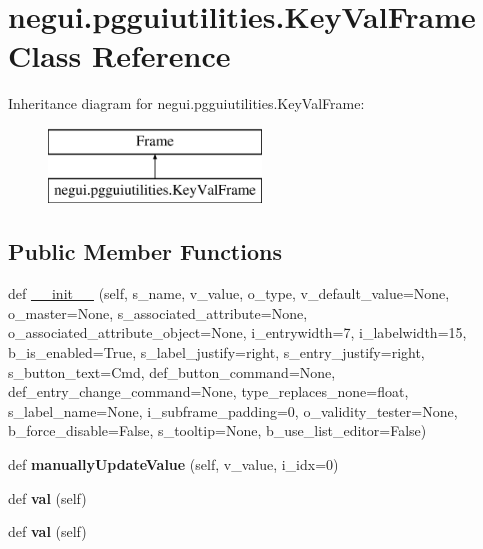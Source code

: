 \hypertarget{classnegui_1_1pgguiutilities_1_1KeyValFrame}{}\section{negui.\+pgguiutilities.\+Key\+Val\+Frame Class Reference}
\label{classnegui_1_1pgguiutilities_1_1KeyValFrame}
Inheritance diagram for negui.\+pgguiutilities.\+Key\+Val\+Frame\+:\begin{figure}[H]
\begin{center}
\leavevmode
\includegraphics[height=2.000000cm]{classnegui_1_1pgguiutilities_1_1KeyValFrame}
\end{center}
\end{figure}
\subsection*{Public Member Functions}
\begin{DoxyCompactItemize}
\item 
def \hyperlink{classnegui_1_1pgguiutilities_1_1KeyValFrame_a9d507011f4523f708351c682b788f3e5}{\+\_\+\+\_\+init\+\_\+\+\_\+} (self, s\+\_\+name, v\+\_\+value, o\+\_\+type, v\+\_\+default\+\_\+value=None, o\+\_\+master=None, s\+\_\+associated\+\_\+attribute=None, o\+\_\+associated\+\_\+attribute\+\_\+object=None, i\+\_\+entrywidth=7, i\+\_\+labelwidth=15, b\+\_\+is\+\_\+enabled=True, s\+\_\+label\+\_\+justify=\textquotesingle{}right\textquotesingle{}, s\+\_\+entry\+\_\+justify=\textquotesingle{}right\textquotesingle{}, s\+\_\+button\+\_\+text=\textquotesingle{}Cmd\textquotesingle{}, def\+\_\+button\+\_\+command=None, def\+\_\+entry\+\_\+change\+\_\+command=None, type\+\_\+replaces\+\_\+none=float, s\+\_\+label\+\_\+name=None, i\+\_\+subframe\+\_\+padding=0, o\+\_\+validity\+\_\+tester=None, b\+\_\+force\+\_\+disable=False, s\+\_\+tooltip=None, b\+\_\+use\+\_\+list\+\_\+editor=False)
\item 
def {\bfseries manually\+Update\+Value} (self, v\+\_\+value, i\+\_\+idx=0)\hypertarget{classnegui_1_1pgguiutilities_1_1KeyValFrame_a0294b9b997f26832e76783b4d9a7404f}{}\label{classnegui_1_1pgguiutilities_1_1KeyValFrame_a0294b9b997f26832e76783b4d9a7404f}

\item 
def {\bfseries val} (self)\hypertarget{classnegui_1_1pgguiutilities_1_1KeyValFrame_a735c32759de5e4519d15ec2511da6e4f}{}\label{classnegui_1_1pgguiutilities_1_1KeyValFrame_a735c32759de5e4519d15ec2511da6e4f}

\item 
def {\bfseries val} (self)\hypertarget{classnegui_1_1pgguiutilities_1_1KeyValFrame_a735c32759de5e4519d15ec2511da6e4f}{}\label{classnegui_1_1pgguiutilities_1_1KeyValFrame_a735c32759de5e4519d15ec2511da6e4f}

\end{DoxyCompactItemize}
